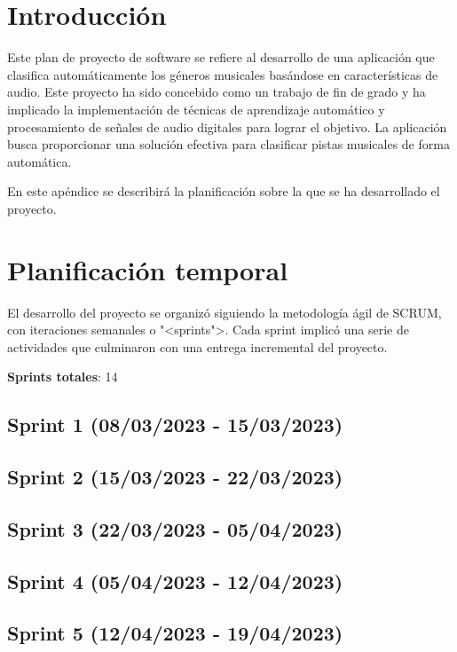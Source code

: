 
\section{Introducción}

Este plan de proyecto de software se refiere al desarrollo de una aplicación que clasifica automáticamente los géneros musicales basándose en características de audio. 
Este proyecto ha sido concebido como un trabajo de fin de grado y ha implicado la implementación de técnicas de aprendizaje automático y procesamiento de señales de audio digitales para lograr el objetivo.
La aplicación busca proporcionar una solución efectiva para clasificar pistas musicales de forma automática.

En este apéndice se describirá la planificación sobre la que se ha desarrollado el proyecto.

\section{Planificación temporal}

El desarrollo del proyecto se organizó siguiendo la metodología ágil de SCRUM, con iteraciones semanales o "<sprints">. 
Cada sprint implicó una serie de actividades que culminaron con una entrega incremental del proyecto.

\textbf{Sprints totales}: 14

\subsection{Sprint 1 (08/03/2023 - 15/03/2023)}

\subsection{Sprint 2 (15/03/2023 - 22/03/2023)}

\subsection{Sprint 3 (22/03/2023 - 05/04/2023)}

\subsection{Sprint 4 (05/04/2023 - 12/04/2023)}

\subsection{Sprint 5 (12/04/2023 - 19/04/2023)}


